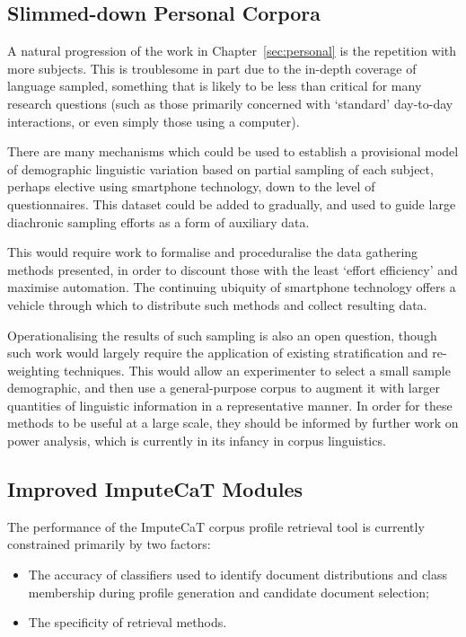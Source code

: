\subsection{Slimmed-down Personal Corpora}
A natural progression of the work in Chapter~\ref{sec:personal} is the repetition with more subjects.  This is troublesome in part due to the in-depth coverage of language sampled, something that is likely to be less than critical for many research questions (such as those primarily concerned with `standard' day-to-day interactions, or even simply those using a computer).

There are many mechanisms which could be used to establish a provisional model of demographic linguistic variation based on partial sampling of each subject, perhaps elective using smartphone technology, down to the level of questionnaires.  This dataset could be added to gradually, and used to guide large diachronic sampling efforts as a form of auxiliary data.

This would require work to formalise and proceduralise the data gathering methods presented, in order to discount those with the least `effort efficiency' and maximise automation.  The continuing ubiquity of smartphone technology offers a vehicle through which to distribute such methods and collect resulting data.

Operationalising the results of such sampling is also an open question, though such work would largely require the application of existing stratification and re-weighting techniques.  This would allow an experimenter to select a small sample demographic, and then use a general-purpose corpus to augment it with larger quantities of linguistic information in a representative manner.  In order for these methods to be useful at a large scale, they should be informed by further work on power analysis, which is currently in its infancy in corpus linguistics.



\subsection{Improved ImputeCaT Modules}
The performance of the ImputeCaT corpus profile retrieval tool is currently constrained primarily by two factors:

\begin{itemize}
    \item The accuracy of classifiers used to identify document distributions and class membership during profile generation and candidate document selection;
    \item The specificity of retrieval methods.
\end{itemize}

